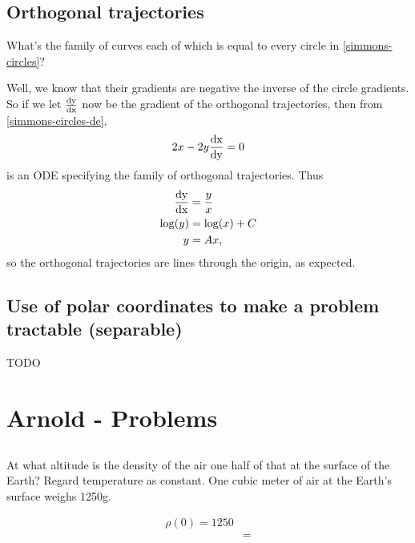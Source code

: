 \subsection{Orthogonal trajectories}
What's the family of curves each of which is equal to every circle in \eqref{simmons-circles}?

Well, we know that their gradients are negative the inverse of the circle
gradients. So if we let $\frac{\operatorname{\text{dy}}}{\operatorname{\text{dx}}}$ now be the gradient of the orthogonal
trajectories, then from \eqref{simmons-circles-de},
\begin{align*}
  2x - 2y\frac{\operatorname{\text{dx}}}{\operatorname{\text{dy}}} = 0
\end{align*}
is an ODE specifying the family of orthogonal trajectories. Thus
\begin{align*}
  \frac{\operatorname{\text{dy}}}{\operatorname{\text{dx}}} &= \frac{y}{x}\\
  \log(y) &= \log(x) + C\\
       y &= Ax,
\end{align*}
so the orthogonal trajectories are lines through the origin, as expected.

\subsection{Use of polar coordinates to make a problem tractable (separable)}
TODO

\section{Arnold - Problems}
\subsection{}
\begin{mdframed}
  At what altitude is the density of the air one half of that at the surface of
  the Earth? Regard temperature as constant. One cubic meter of air at the
  Earth's surface weighs 1250g.
\end{mdframed}
\begin{align*}
  \rho(0) = 1250\\
  &=
\end{align*}
